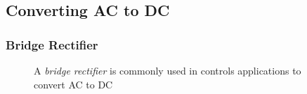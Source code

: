 %                     
%                     

\subsection{Converting AC to DC}

\begin{frame}
    \frametitle{Bridge Rectifier}

    \begin{figure}
        \centering
        \resizebox{0.5\linewidth}{!}{
            
        }

        {\footnotesize A \emph{bridge rectifier} is commonly used in controls applications to convert AC to DC}

    \end{figure}

\end{frame}

